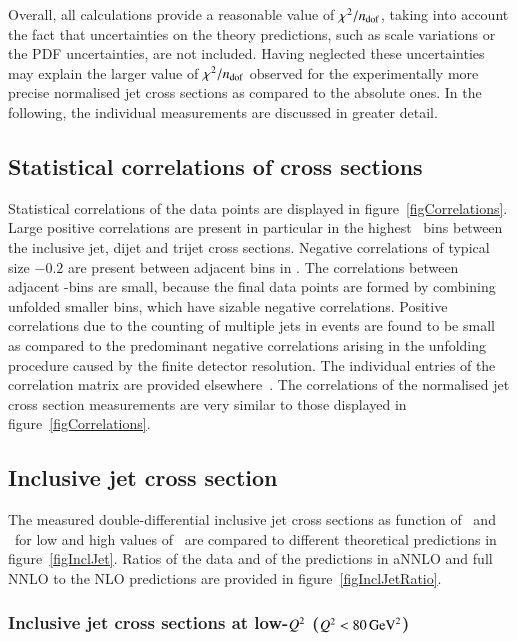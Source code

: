 \documentclass[12pt]{article}
\begin{document}
Overall, all calculations provide a reasonable value of $\chisq/\ndf$, taking into account 
the fact that uncertainties on the theory predictions, such as scale variations 
or the PDF uncertainties, are not included.
Having neglected these uncertainties may explain the larger value of $\chisq/\ndf$ observed
for the experimentally more precise normalised jet cross sections as compared to the absolute ones.
In the following, the individual measurements are discussed in
 greater detail.

\subsection{Statistical correlations of cross sections}
Statistical correlations of the data points are displayed in figure~\ref{figCorrelations}.
Large positive correlations are present in particular in the highest \pt\ bins between the inclusive jet,
dijet and trijet cross sections.
Negative correlations of typical size $-0.2$ are present between adjacent bins in \Qsq.
The correlations between adjacent \pt-bins are small,
because the final data points are formed by combining unfolded smaller bins, 
which have sizable negative correlations.
Positive correlations due to the counting of multiple jets in events are found to be small as compared 
to the predominant negative correlations arising in the unfolding procedure
caused by the finite detector resolution.
The individual entries of the correlation matrix are provided elsewhere~\cite{results}. %
The correlations of the normalised jet cross section measurements are 
very similar to those displayed in figure~\ref{figCorrelations}.


\subsection{Inclusive jet cross section}
\label{sec:Ijets}
The measured double-differential inclusive jet cross sections as function of \ptjet\  and \Qsq\ for low and high values of \Qsq\
are compared to different theoretical predictions in figure~\ref{figInclJet}. 
Ratios of the data and of the predictions in aNNLO and full NNLO to the NLO predictions are provided in figure~\ref{figInclJetRatio}.

\begin{boldmath}
\subsubsection{Inclusive jet cross sections at low-$\Qsq$ ($\Qsq<80\,\GeVsq$)}
\end{boldmath}
\end{document}
